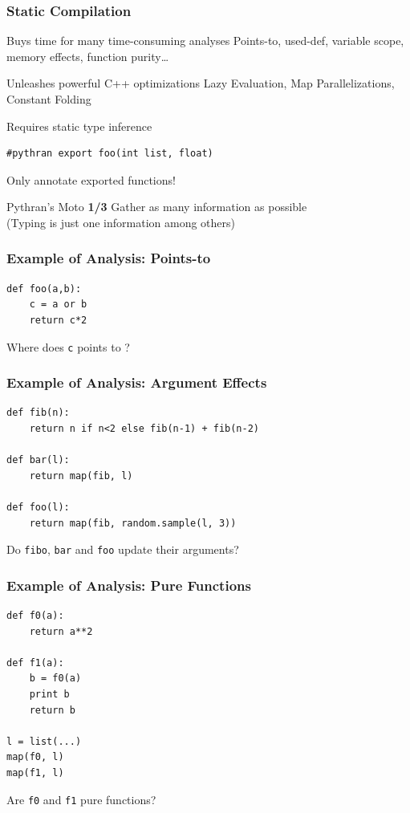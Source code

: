 \documentclass[aspectratio=1610]{beamer}
\begin{document}
\begin{frame}[fragile]
    \frametitle{Static Compilation}
    \begin{block}{Buys time for many time-consuming analyses}
        Points-to, used-def, variable scope, memory effects, function purity\dots
    \end{block}
    \begin{block}{Unleashes powerful C++ optimizations}
        Lazy Evaluation, Map Parallelizations, Constant Folding
    \end{block}
    \begin{block}{Requires static type inference}
        \begin{lstlisting}[lang=python]
        #pythran export foo(int list, float)
        \end{lstlisting}
        \centering Only annotate exported functions!
    \end{block}
\end{frame}

\begin{frame}{Pythran's Moto \textbf{1/3}}
\Large\centering Gather as many information as possible\\
\vfill
\normalsize(Typing is just one information among others)\\
\end{frame}


\begin{frame}[fragile]
    \frametitle{Example of Analysis: Points-to}
    \begin{lstlisting}[lang=python]
def foo(a,b):
    c = a or b
    return c*2
    \end{lstlisting}
    \vfill
    \centering\Large Where does \lstinline|c| points to ?
\end{frame}

\begin{frame}[fragile]
    \frametitle{Example of Analysis: Argument Effects}
    \begin{lstlisting}[lang=python]
def fib(n):
    return n if n<2 else fib(n-1) + fib(n-2)

def bar(l):
    return map(fib, l)

def foo(l):
    return map(fib, random.sample(l, 3))
    \end{lstlisting}
    \vfill
    \centering\Large Do \texttt{fibo}, \texttt{bar} and \texttt{foo} update their arguments?
\end{frame}

\begin{frame}[fragile]
    \frametitle{Example of Analysis: Pure Functions}
    \begin{lstlisting}[lang=python]
def f0(a):
    return a**2

def f1(a):
    b = f0(a)
    print b
    return b

l = list(...)
map(f0, l)
map(f1, l)
    \end{lstlisting}
    \vfill\centering\Large Are \texttt{f0} and \texttt{f1} pure functions?
\end{frame}
\end{document}
